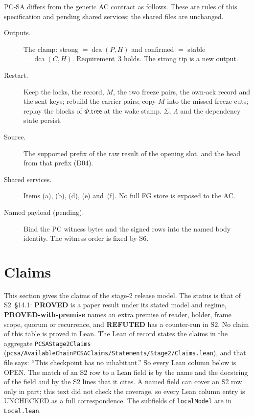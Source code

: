 \documentclass{article}
\newcommand{\Fr}{\Phi}
\newcommand{\tree}{\mathsf{tree}}
\newcommand{\nm}[1]{\nolinkurl{#1}}
\begin{document}
PC-SA differs from the generic AC contract as follows.  These are rules of
this specification and pending shared services; the shared files are
unchanged.
\begin{description}
\item[Outputs.] The clamp: strong $=\operatorname{dca}(P,H)$ and
confirmed $=$ stable $=\operatorname{dca}(C,H)$.  Requirement~3 holds.  The
strong tip is a new output.
\item[Restart.] Keep the locks, the record, $M$, the two freeze pairs, the
own-ack record and the sent keys; rebuild the carrier pairs; copy $M$ into
the missed freeze cuts; replay the blocks of $\Fr.\tree$ at the wake
stamp.  $\Sigma$, $\Lambda$ and the dependency state persist.
\item[Source.] The supported prefix of the raw result of the opening slot,
and the head from that prefix (D04).
\item[Shared services.] Items (a), (b), (d), (e) and~(f).  No full FG store
is exposed to the AC.
\item[Named payload (pending).] Bind the PC witness bytes and the signed
rows into the named body identity.  The witness order is fixed by S6.
\end{description}

\section{Claims}\label{sec:claims}

This section gives the claims of the stage-2 release model.  The status
is that of S2~\S14.1: \textbf{PROVED} is a paper result under its stated
model and regime, \textbf{PROVED-with-premise} names an extra premise of
reader, holder, frame scope, quorum or recurrence, and \textbf{REFUTED}
has a counter-run in S2.  No claim of this table is proved in Lean.  The
Lean of record states the claims in the aggregate \nm{PCSAStage2Claims}
(\nm{pcsa/AvailableChainPCSAClaims/Statements/Stage2/Claims.lean}), and
that file says: ``This checkpoint has no inhabitant.''  So every Lean
column below is OPEN.  The match of an S2 row to a Lean field is by the
name and the docstring of the field and by the S2 lines that it cites.  A
named field can cover an S2 row only in part; this text did not check the
coverage, so every Lean column entry is UNCHECKED as a full
correspondence.  The subfields of \nm{localModel} are in \nm{Local.lean}.
\end{document}
